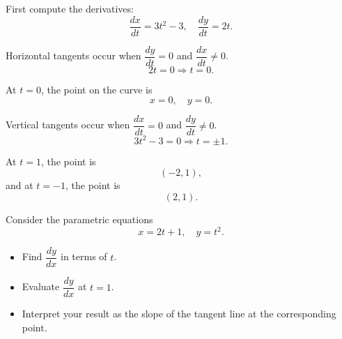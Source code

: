 \begin{Answer}[ref=parametric3]

    First compute the derivatives:
    \begin{equation*}
        \frac{dx}{dt} = 3t^2 - 3, \quad \frac{dy}{dt} = 2t.
    \end{equation*}

    Horizontal tangents occur when $\dfrac{dy}{dt} = 0$ and $\dfrac{dx}{dt} \neq 0$.
    \begin{equation*}
        2t = 0 \Rightarrow t = 0.
    \end{equation*}

    At $t = 0$, the point on the curve is
    \begin{equation*}
        x = 0, \quad y = 0.
    \end{equation*}

    Vertical tangents occur when $\dfrac{dx}{dt} = 0$ and $\dfrac{dy}{dt} \neq 0$.
    \begin{equation*}
        3t^2 - 3 = 0 \Rightarrow t = \pm 1.
    \end{equation*}

    At $t = 1$, the point is
    \begin{equation*}
        ( -2, 1 ),
    \end{equation*}
    and at $t = -1$, the point is
    \begin{equation*}
        ( 2, 1 ).
    \end{equation*}

\end{Answer}


\begin{Exercise}[label = parametric4]

    Consider the parametric equations
    \begin{equation*}
        x = 2t + 1, \quad y = t^2.
    \end{equation*}

    \begin{itemize}
        \item[(a)] Find $\dfrac{dy}{dx}$ in terms of $t$.
        \item[(b)] Evaluate $\dfrac{dy}{dx}$ at $t = 1$.
        \item[(c)] Interpret your result as the slope of the tangent line at the corresponding point.
    \end{itemize}
\end{Exercise}

